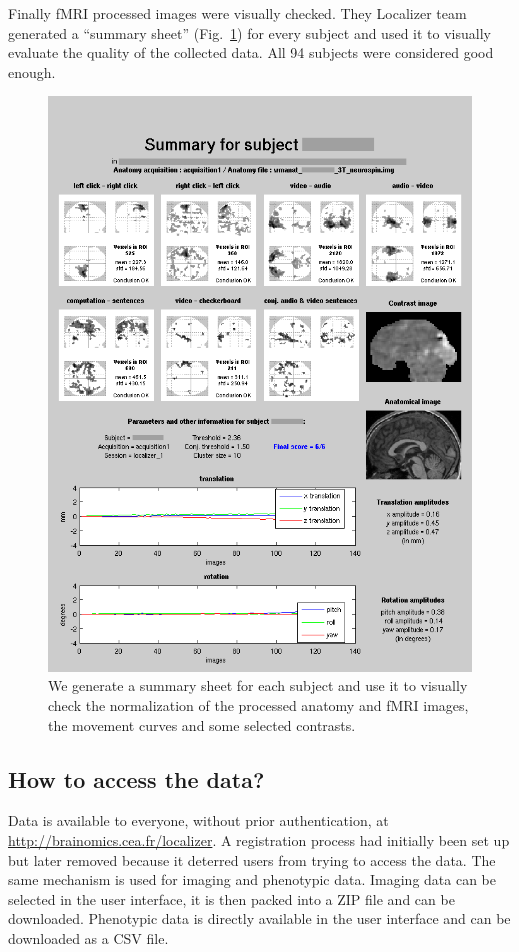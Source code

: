 \documentclass[review]{elsarticle}
\begin{document}
Finally fMRI processed images were visually checked. They Localizer team
generated a ``summary sheet'' (Fig.~\ref{fig:summary}) for every subject and
used it to visually evaluate the quality of the collected data. All 94 subjects
were considered good enough.

\begin{figure}[h!]
    \centering
    \includegraphics[scale=0.25]{summary}
    \caption{We generate a summary sheet for each subject and use it to
    visually check the normalization of the processed anatomy and fMRI
    images, the movement curves and some selected contrasts.}
    \label{fig:summary}
\end{figure}


\subsection{How to access the data?}

Data is available to everyone, without prior authentication, at
\url{http://brainomics.cea.fr/localizer}. A registration process
had initially been set up but later removed because it deterred
users from trying to access the data. The same mechanism is used
for imaging and phenotypic data. Imaging data can be selected in the
user interface, it is then packed into a ZIP file and can be downloaded.
Phenotypic data is directly available in the user interface and can be
downloaded as a CSV file.
\end{document}
